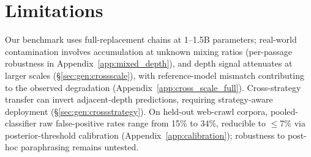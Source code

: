 \section*{Limitations}
\label{sec:limitations}

Our benchmark uses full-replacement chains at 1--1.5B parameters; real-world contamination involves accumulation at unknown mixing ratios (per-passage robustness in Appendix~\ref{app:mixed_depth}), and depth signal attenuates at larger scales (\S\ref{sec:gen:crossscale}), with reference-model mismatch contributing to the observed degradation (Appendix~\ref{app:cross_scale_full}).
Cross-strategy transfer can invert adjacent-depth predictions, requiring strategy-aware deployment (\S\ref{sec:gen:crossstrategy}).
On held-out web-crawl corpora, pooled-classifier raw false-positive rates range from 15\% to 34\%, reducible to ${\leq}$7\% via posterior-threshold calibration (Appendix~\ref{app:calibration}); robustness to post-hoc paraphrasing remains untested.
